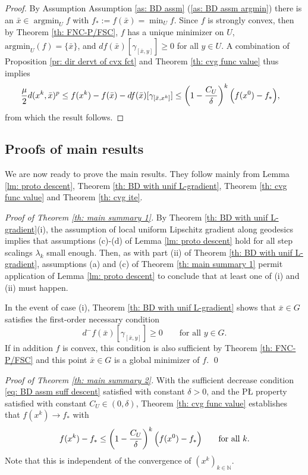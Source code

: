 \documentclass{article}
\theoremstyle{plain}\newtheorem{theorem}{Theorem}[section]
\theoremstyle{plain}\newtheorem{definition}[theorem]{Definition}
\theoremstyle{plain}\newtheorem{lemma}[theorem]{Lemma}
\theoremstyle{definition}\newtheorem{remark}[theorem]{Remark}
\theoremstyle{definition}\newtheorem{example}[theorem]{Example}
\theoremstyle{plain}\newtheorem{proposition}[theorem]{Proposition}
\theoremstyle{plain}\newtheorem{inference}[theorem]{Inference}
\theoremstyle{plain}\newtheorem{corollary}[theorem]{Corollary}
\theoremstyle{plain}\newtheorem{assumption}[theorem]{Assumption}
\DeclareMathOperator*{\argmin}{argmin}
\newcommand{\xbar}{\bar{x}}
\newcommand{\bbN}{\mathbb{N}}
\begin{document}
\begin{proof}
    By Assumption Assumption \ref{as: BD assm} (\ref{as: BD assm argmin}) there is an $\xbar\in\argmin_U f$ with $f_*:=f(\xbar)=\min_U f$. Since $f$ is strongly convex, then by Theorem \ref{th: FNC-P/FSC}, $f$ has a unique minimizer on $U$, $\mathrm{argmin}_U(f)=\{\bar{x}\}$, and $df(\bar{x})[\gamma_{[\bar{x},y]}]\geq 0$ for all $y\in U$. A combination of Proposition \ref{pr: dir dervt of cvx fct} and Theorem \ref{th: cvg func value} thus implies
    \begin{align*}
        \frac{\mu}{2}d(x^k,\bar{x})^p&\leq f(x^k)-f(\bar{x})-df(\bar{x})[\gamma_{[\bar{x},x^k]}]\leq\left(1-\frac{C_U}{\delta}\right)^k\Bigl(f(x^0)-f_*\Bigr),
    \end{align*}
    from which the result follows.
\end{proof}
\subsection{Proofs of main results}\label{sec: proofs main results}
We are now ready to prove the main results. They follow mainly from Lemma \ref{lm: proto descent}, Theorem \ref{th: BD with unif L-gradient}, Theorem \ref{th: cvg func value} and Theorem \ref{th: cvg ite}.

{\em Proof of Theorem \ref{th: main summary 1}.} By Theorem \ref{th: BD with unif L-gradient}(i), the assumption of local uniform Lipschitz gradient along geodesics implies that assumptions (c)-(d) of Lemma \ref{lm: proto descent} hold for all step scalings $\lambda_k$ small enough. Then, as with part (ii) of Theorem \ref{th: BD with unif L-gradient}, assumptions (a) and (c) of Theorem \ref{th: main summary 1} permit application of Lemma \ref{lm: proto descent} to conclude that at least one of (i) and (ii) must happen.

In the event of case (i), Theorem \ref{th: BD with unif L-gradient} shows that $\bar{x}\in G$ satisfies the first-order necessary condition
$$
d^-f(\bar{x})[\gamma_{[\bar{x}, y]}]\geq 0 \qquad\text{for all}\,\,y\in G.
$$
If in addition $f$ is convex, this condition is also sufficient by Theorem \ref{th: FNC-P/FSC} and this point $\bar{x}\in G$ is a global minimizer of $f$. \qed

{\em Proof of Theorem \ref{th: main summary 2}.} With the sufficient decrease condition \eqref{eq: BD assm suff descent} satisfied with constant $\delta>0$, and the PŁ property satisfied with constant $C_U\in(0,\delta)$, Theorem \ref{th: cvg func value} establishes that $f(x^k)\to f_*$ with
$$
f(x^k)-f_*\leq\left(1-\frac{C_U}{\delta}\right)^k\Bigl(f(x^0)-f_*\Bigr) \qquad\text{for all}\,\,k.
$$
Note that this is independent of the convergence of $(x^k)_{k\in\bbN}$.
\end{document}
